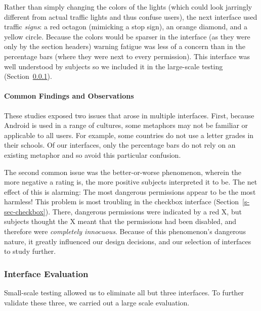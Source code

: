 \documentclass[11pt]{article}
\newcommand{\refsec}[1]{Section~\ref{#1}}
\begin{document}
\label{ss-sec-traffic-r4}

Rather than simply changing the colors of
the lights (which  
could look jarringly different from actual traffic lights and thus confuse users), 
the next interface used traffic \emph{signs}: a red octagon
(mimicking a stop sign), an orange diamond, and a yellow circle. 
Because the colors would be sparser in the interface (as they were only by the section 
headers) warning fatigue was less of
a concern than in the percentage bars 
(where they were next to every permission). 
This interface was well understood by subjects so we included it
in the large-scale testing (\refsec{s-sec-largescale}).


\paragraph{Common Findings and Observations}
\label{common-findings}

These studies exposed two issues that arose in multiple 
interfaces. First, because Android is used in a range of 
cultures, some metaphors may not be familiar or applicable to all users.
For example, some countries 
do not use a letter grades in their schools.
Of our interfaces, only the percentage bars do 
not rely on an existing metaphor and so avoid this particular confusion.

The second common issue was the better-or-worse phenomenon, 
wherein the more negative a rating is, the more positive subjects interpreted 
it to be. The net effect of this is alarming: The most dangerous permissions 
appear to be the most harmless! This problem is 
most troubling in the checkbox interface (\refsec{s-sec-checkbox}). 
There, dangerous permissions were indicated by a red X, but 
subjects thought the X meant that the permissions had been disabled, and therefore 
were \emph{completely innocuous}. Because of this phenomenon's dangerous nature, it greatly 
influenced our design decisions, and our selection of interfaces to study further.



\subsubsection{Interface Evaluation}
\label{s-sec-largescale}

Small-scale testing allowed us to eliminate all but three interfaces. 
To further validate these three, we carried out a large scale evaluation.
\end{document}
